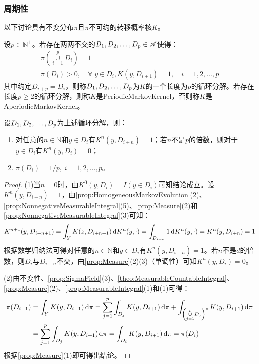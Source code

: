 \subsubsection{周期性}
以下讨论具有不变分布$\pi$且$\pi$不可约的转移概率核$K$。
\begin{definition}
	设$p\in\mathbb{N}^+$。若存在两两不交的$D_1, D_2, \dots, D_{p}\in\mathscr{A}$使得：
	\begin{gather*}
		\pi\left(\underset{i=1}{\overset{p}{\cup}}D_i\right)=1 \\
		\pi(D_i)>0,\quad\forall\;y\in D_i,K(y,D_{i+1})=1,\quad i=1,2,\dots,p
	\end{gather*}
	其中约定$D_{i+p}=D_i$，则称$D_1, D_2, \dots, D_{p}$为$K$的一个长度为$p$的循环分解。若存在长度$p\geqslant2$的循环分解，则称$K$是\gls{PeriodicMarkovKernel}，否则称$K$是\gls{AperiodicMarkovKernel}。
\end{definition}
\begin{property}\label{prop:MarkovCyclicEvolution}
	设$D_1, D_2, \dots, D_{p}$为上述循环分解，则：
	\begin{enumerate}
		\item 对任意的$n\in\mathbb{N}$和$y\in D_i$有$K^n(y,D_{i+n})=1$；若$n$不是$p$的倍数，则对于$y\in D_i$有$K^n(y,D_i)=0$；
		\item $\pi(D_i)=1/p,\;i=1,2,\dots,p$。
	\end{enumerate}
\end{property}
\begin{proof}
	(1)当$n=0$时，由$K^0(y,D_i)=I(y\in D_i)$可知结论成立。设$K^n(y,D_{i+n})=1$，由\cref{prop:HomogeneousMarkovEvolution}(2)、\cref{prop:NonnegativeMeasurableIntegral}(5)、\cref{prop:Measure}(2)和\cref{prop:NonnegativeMeasurableIntegral}(3)可知：
	\begin{equation*}
		K^{n+1}(y,D_{i+n+1})=\int_{Y}K(z,D_{i+n+1})\mathop{}\!\mathrm{d} K^n(y,\cdot)=\int_{D_{i+n}}1\mathop{}\!\mathrm{d} K^n(y,\cdot)=K^n(y,D_{i+n})=1
	\end{equation*}
	根据数学归纳法可得对任意的$n\in\mathbb{N}$和$y\in D_i$有$K^n(y,D_{i+n})=1$。若$n$不是$d$的倍数，则$D_i$与$D_{i+n}$不交，由\cref{prop:Measure}(2)(3)（单调性）可知$K^n(y,D_i)=0$。\par
	(2)由不变性、\cref{prop:SigmaField}(3)、\cref{theo:MeasurableCountableIntegral}、\cref{prop:Measure}(2)、\cref{prop:MeasurableIntegral}(1)和(1)可得：
	\begin{align*}
		\pi(D_{i+1})&=\int_{Y}K(y,D_{i+1})\mathop{}\!\mathrm{d}\pi=\sum_{j=1}^{p}\int_{D_j}K(y,D_{i+1})\mathop{}\!\mathrm{d}\pi+\int_{\left(\underset{j=1}{\overset{p}{\cup}}D_j\right)^c}K(y,D_{i+1})\mathop{}\!\mathrm{d}\pi \\
		&=\sum_{j=1}^{p}\int_{D_j}K(y,D_{i+1})\mathop{}\!\mathrm{d}\pi=\int_{D_i}K(y,D_{i+1})\mathop{}\!\mathrm{d}\pi=\pi(D_i)
	\end{align*}
	根据\cref{prop:Measure}(1)即可得出结论。
\end{proof}
